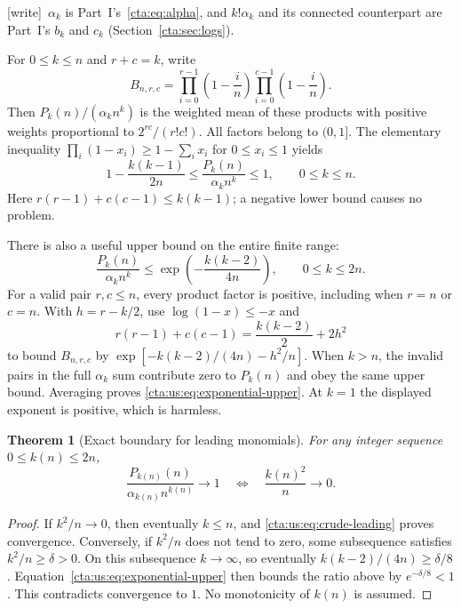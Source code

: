 \documentclass[11pt]{article}
\newtheorem{theorem}{Theorem}[section]
\theoremstyle{definition}
\theoremstyle{remark}
\newcommand{\wtag}{\textup{[write]}}
\begin{document}
\wtag\ $\alpha_k$ is Part~I's~\eqref{cta:eq:alpha}, and $k!\alpha_k$ and its
connected counterpart are Part~I's $b_k$ and $c_k$
(Section~\ref{cta:sec:logs}).

For $0\le k\le n$ and $r+c=k$, write
\begin{equation}\label{cta:us:eq:B}
 B_{n,r,c}=
 \prod_{i=0}^{r-1}\left(1-\frac in\right)
 \prod_{i=0}^{c-1}\left(1-\frac in\right).
\end{equation}
Then $P_k(n)/(\alpha_kn^k)$ is the weighted mean of these products
with positive weights proportional to $2^{rc}/(r!c!)$. All factors
belong to $(0,1]$. The elementary inequality
$\prod_i(1-x_i)\ge1-\sum_i x_i$ for $0\le x_i\le1$ yields
\begin{equation}\label{cta:us:eq:crude-leading}
 1-\frac{k(k-1)}{2n}
 \le\frac{P_k(n)}{\alpha_kn^k}\le1,
 \qquad 0\le k\le n.
\end{equation}
Here $r(r-1)+c(c-1)\le k(k-1)$; a negative lower bound causes no
problem.

There is also a useful upper bound on the entire finite range:
\begin{equation}\label{cta:us:eq:exponential-upper}
 \frac{P_k(n)}{\alpha_kn^k}
 \le\exp\left(-\frac{k(k-2)}{4n}\right),
 \qquad 0\le k\le2n.
\end{equation}
For a valid pair $r,c\le n$, every product factor is positive, including
when $r=n$ or $c=n$. With $h=r-k/2$, use
$\log(1-x)\le-x$ and
\[
 r(r-1)+c(c-1)=\frac{k(k-2)}2+2h^2
\]
to bound $B_{n,r,c}$ by
$\exp[-k(k-2)/(4n)-h^2/n]$. When $k>n$, the invalid pairs in
the full $\alpha_k$ sum contribute zero to $P_k(n)$ and obey the
same upper bound. Averaging proves \eqref{cta:us:eq:exponential-upper}.
At $k=1$ the displayed exponent is positive, which is harmless.

\begin{theorem}[Exact boundary for leading monomials]\label{cta:us:thm:iff}
For any integer sequence $0\le k(n)\le2n$,
\begin{equation}\label{cta:us:eq:iff}
 \frac{P_{k(n)}(n)}{\alpha_{k(n)}n^{k(n)}}\longrightarrow1
 \quad\Longleftrightarrow\quad
 \frac{k(n)^2}{n}\longrightarrow0.
\end{equation}
\end{theorem}
\begin{proof}
If $k^2/n\to0$, then eventually $k\le n$, and
\eqref{cta:us:eq:crude-leading} proves convergence. Conversely, if $k^2/n$
does not tend to zero, some subsequence satisfies $k^2/n\ge\delta>0$.
On this subsequence $k\to\infty$, so eventually
$k(k-2)/(4n)\ge\delta/8$. Equation~\eqref{cta:us:eq:exponential-upper}
then bounds the ratio above by $e^{-\delta/8}<1$. This contradicts
convergence to $1$. No monotonicity of $k(n)$ is assumed.
\end{proof}
\end{document}
